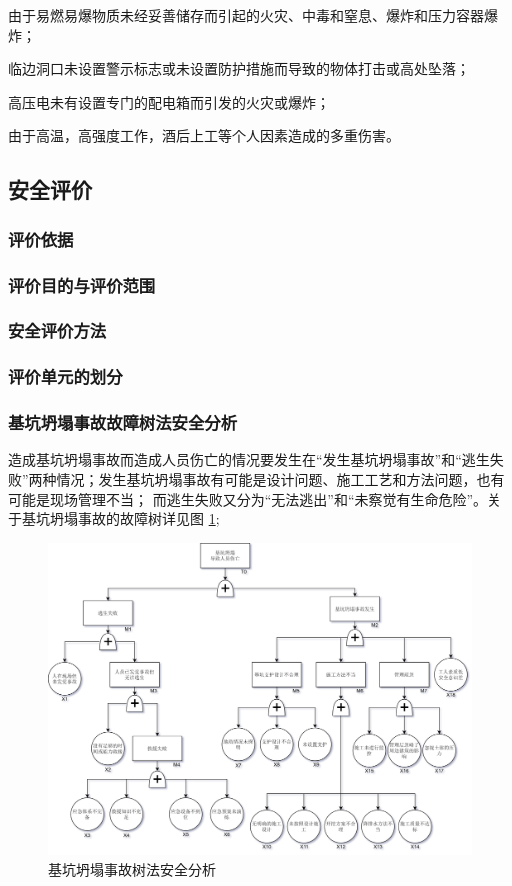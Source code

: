  由于易燃易爆物质未经妥善储存而引起的火灾、中毒和窒息、爆炸和压力容器爆炸；

 临边洞口未设置警示标志或未设置防护措施而导致的物体打击或高处坠落；

 高压电未有设置专门的配电箱而引发的火灾或爆炸；

 由于高温，高强度工作，酒后上工等个人因素造成的多重伤害。

\subsection{安全评价}
\subsubsection{评价依据}
\subsubsection{评价目的与评价范围}
\subsubsection{安全评价方法}
\subsubsection{评价单元的划分}
\subsubsection{基坑坍塌事故故障树法安全分析}

造成基坑坍塌事故而造成人员伤亡的情况要发生在“发生基坑坍塌事故”和“逃生失败”两种情况；发生基坑坍塌事故有可能是设计问题、施工工艺和方法问题，也有可能是现场管理不当；
而逃生失败又分为“无法逃出”和“未察觉有生命危险”。关于基坑坍塌事故的故障树详见图 \ref{fig:c3f1};

\begin{figure}[thbp!]
    \centering
    \includegraphics[width=1.0\linewidth]{figure/c3f2.png}
    \caption{基坑坍塌事故树法安全分析}
    \label{fig:c3f1}
\end{figure}

